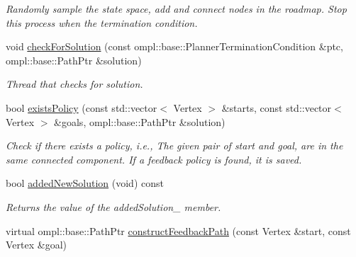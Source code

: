 \begin{DoxyCompactItemize}
\begin{DoxyCompactList}\small\item\em \-Randomly sample the state space, add and connect nodes in the roadmap. \-Stop this process when the termination condition. \end{DoxyCompactList}\item 
\hypertarget{class_f_i_r_m_a4c909fc53ceeeecb6992ccebf0ab60d6}{void \hyperlink{class_f_i_r_m_a4c909fc53ceeeecb6992ccebf0ab60d6}{check\-For\-Solution} (const ompl\-::base\-::\-Planner\-Termination\-Condition \&ptc, ompl\-::base\-::\-Path\-Ptr \&solution)}\label{class_f_i_r_m_a4c909fc53ceeeecb6992ccebf0ab60d6}

\begin{DoxyCompactList}\small\item\em \-Thread that checks for solution. \end{DoxyCompactList}\item 
\hypertarget{class_f_i_r_m_a937a58c35d6f8d5c26d09acbcc340d9a}{bool \hyperlink{class_f_i_r_m_a937a58c35d6f8d5c26d09acbcc340d9a}{exists\-Policy} (const std\-::vector$<$ \-Vertex $>$ \&starts, const std\-::vector$<$ \-Vertex $>$ \&goals, ompl\-::base\-::\-Path\-Ptr \&solution)}\label{class_f_i_r_m_a937a58c35d6f8d5c26d09acbcc340d9a}

\begin{DoxyCompactList}\small\item\em \-Check if there exists a policy, i.\-e., \-The given pair of {\itshape start\/} and {\itshape goal\/}, are in the same connected component. \-If a feedback policy is found, it is saved. \end{DoxyCompactList}\item 
\hypertarget{class_f_i_r_m_a341a81deb4e550fbacf6c239a801d2a8}{bool \hyperlink{class_f_i_r_m_a341a81deb4e550fbacf6c239a801d2a8}{added\-New\-Solution} (void) const }\label{class_f_i_r_m_a341a81deb4e550fbacf6c239a801d2a8}

\begin{DoxyCompactList}\small\item\em \-Returns the value of the added\-Solution\-\_\- member. \end{DoxyCompactList}\item 
\hypertarget{class_f_i_r_m_a6a5bc8f73d3440780f68ba2ed2fae8c3}{virtual ompl\-::base\-::\-Path\-Ptr \hyperlink{class_f_i_r_m_a6a5bc8f73d3440780f68ba2ed2fae8c3}{construct\-Feedback\-Path} (const \-Vertex \&start, const \-Vertex \&goal)}\label{class_f_i_r_m_a6a5bc8f73d3440780f68ba2ed2fae8c3}


\end{DoxyCompactItemize}
